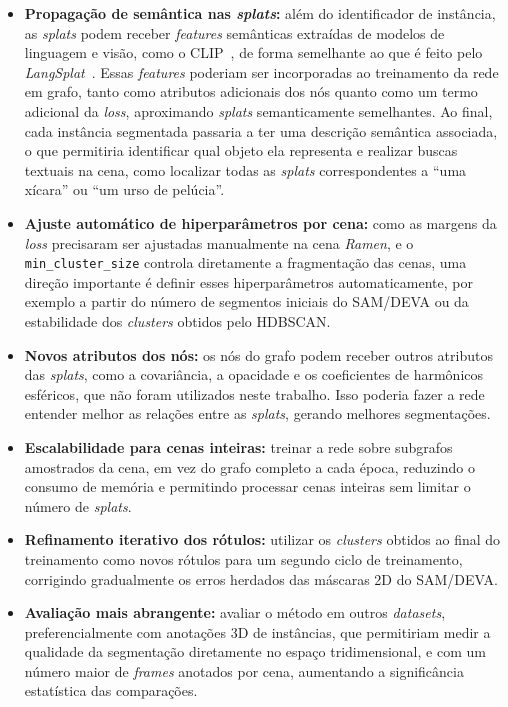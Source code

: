 \begin{itemize}
     \item \textbf{Propagação de semântica nas \emph{splats}:} além do identificador de instância, as \emph{splats} podem receber \textit{features} semânticas extraídas de modelos de linguagem e visão, como o CLIP~\cite{radford2021learning}, de forma semelhante ao que é feito pelo \textit{LangSplat}~\cite{Qin_2024_CVPR}. Essas \textit{features} poderiam ser incorporadas ao treinamento da rede em grafo, tanto como atributos adicionais dos nós quanto como um termo adicional da \emph{loss}, aproximando \emph{splats} semanticamente semelhantes. Ao final, cada instância segmentada passaria a ter uma descrição semântica associada, o que permitiria identificar qual objeto ela representa e realizar buscas textuais na cena, como localizar todas as \emph{splats} correspondentes a ``uma xícara'' ou ``um urso de pelúcia''.

    \item \textbf{Ajuste automático de hiperparâmetros por cena:} como as margens da \emph{loss} precisaram ser ajustadas manualmente na cena \textit{Ramen}, e o \texttt{min\_cluster\_size} controla diretamente a fragmentação das cenas, uma direção importante é definir esses hiperparâmetros automaticamente, por exemplo a partir do número de segmentos iniciais do SAM/DEVA ou da estabilidade dos \textit{clusters} obtidos pelo HDBSCAN.

    \item \textbf{Novos atributos dos nós:} os nós do grafo podem receber outros atributos das \emph{splats}, como a covariância, a opacidade e os coeficientes de harmônicos esféricos, que não foram utilizados neste trabalho. Isso poderia fazer a rede entender melhor as relações entre as \emph{splats}, gerando melhores segmentações.

    \item \textbf{Escalabilidade para cenas inteiras:} treinar a rede sobre subgrafos amostrados da cena, em vez do grafo completo a cada época, reduzindo o consumo de memória e permitindo processar cenas inteiras sem limitar o número de \emph{splats}.

    \item \textbf{Refinamento iterativo dos rótulos:} utilizar os \textit{clusters} obtidos ao final do treinamento como novos rótulos para um segundo ciclo de treinamento, corrigindo gradualmente os erros herdados das máscaras 2D do SAM/DEVA.

    \item \textbf{Avaliação mais abrangente:} avaliar o método em outros \textit{datasets}, preferencialmente com anotações 3D de instâncias, que permitiriam medir a qualidade da segmentação diretamente no espaço tridimensional, e com um número maior de \textit{frames} anotados por cena, aumentando a significância estatística das comparações.
\end{itemize}








